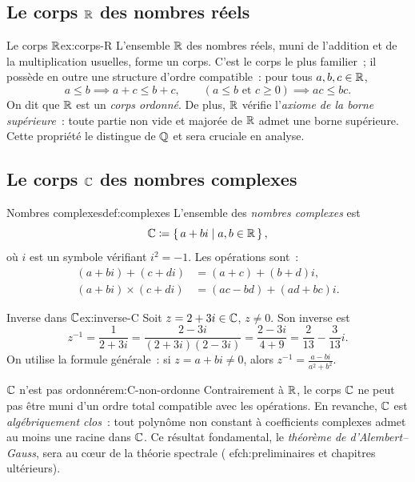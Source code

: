 \subsection{Le corps ${\mathbb{R}}$ des nombres réels}\label{subsec:corps-R}

\begin{example}{Le corps ${\mathbb{R}}$}{ex:corps-R}
  L'ensemble ${\mathbb{R}}$ des nombres réels, muni de l'addition et de la
  multiplication usuelles, forme un corps. C'est le corps le plus
  familier~; il possède en outre une structure d'ordre compatible~: pour
  tous $a,b,c\in{\mathbb{R}}$,
  \[
    a\leq b \implies a+c\leq b+c,
    \qquad
    (a\leq b\text{ et }c\geq 0) \implies ac\leq bc.
  \]
  On dit que ${\mathbb{R}}$ est un \emph{corps ordonné}. De plus, ${\mathbb{R}}$ vérifie
  l'\emph{axiome de la borne supérieure}~: toute partie non vide et
  majorée de ${\mathbb{R}}$ admet une borne supérieure. Cette propriété le
  distingue de ${\mathbb{Q}}$ et sera cruciale en analyse.
\end{example}

\subsection{Le corps ${\mathbb{C}}$ des nombres complexes}\label{subsec:corps-C}

\begin{definition}{Nombres complexes}{def:complexes}
  L'ensemble des \emph{nombres complexes} est
  \[
    {\mathbb{C}} \coloneqq \left\{\,a+bi\;\middle|\;a,b\in{\mathbb{R}}\,\right\},
  \]
  où $i$ est un symbole vérifiant $i^2=-1$. Les opérations sont~:
  \begin{align*}
    (a+bi)+(c+di) &= (a+c)+(b+d)i, \\
    (a+bi)\times(c+di) &= (ac-bd)+(ad+bc)i.
  \end{align*}
\end{definition}

\begin{example}{Inverse dans ${\mathbb{C}}$}{ex:inverse-C}
  Soit $z=2+3i\in{\mathbb{C}}$, $z\neq 0$. Son inverse est
  \[
    z^{-1} = \frac{1}{2+3i} = \frac{2-3i}{(2+3i)(2-3i)}
    = \frac{2-3i}{4+9} = \frac{2}{13}-\frac{3}{13}i.
  \]
  On utilise la formule générale~: si $z=a+bi\neq 0$, alors
  $z^{-1} = \frac{a-bi}{a^2+b^2}$.
\end{example}

\begin{remark}{${\mathbb{C}}$ n'est pas ordonné}{rem:C-non-ordonne}
  Contrairement à ${\mathbb{R}}$, le corps ${\mathbb{C}}$ ne peut pas être muni d'un ordre
  total compatible avec les opérations. En revanche, ${\mathbb{C}}$ est
  \emph{algébriquement clos}~: tout polynôme non constant à coefficients
  complexes admet au moins une racine dans ${\mathbb{C}}$. Ce résultat fondamental,
  le \emph{théorème de d'Alembert--Gauss}, sera au c\oe{}ur de la théorie
  spectrale (
ef{ch:preliminaires} et chapitres ultérieurs).
\end{remark}

